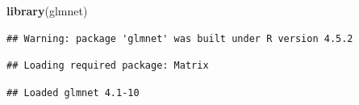 \documentclass[
]{article}
\newenvironment{Shaded}{\begin{snugshade}}{\end{snugshade}}
\newcommand{\FunctionTok}[1]{\textcolor[rgb]{0.13,0.29,0.53}{\textbf{#1}}}
\newcommand{\NormalTok}[1]{#1}
\begin{document}
\begin{Shaded}
\begin{Highlighting}[]
\FunctionTok{library}\NormalTok{(glmnet)}
\end{Highlighting}
\end{Shaded}

\begin{verbatim}
## Warning: package 'glmnet' was built under R version 4.5.2
\end{verbatim}

\begin{verbatim}
## Loading required package: Matrix
\end{verbatim}

\begin{verbatim}
## Loaded glmnet 4.1-10
\end{verbatim}
\end{document}
